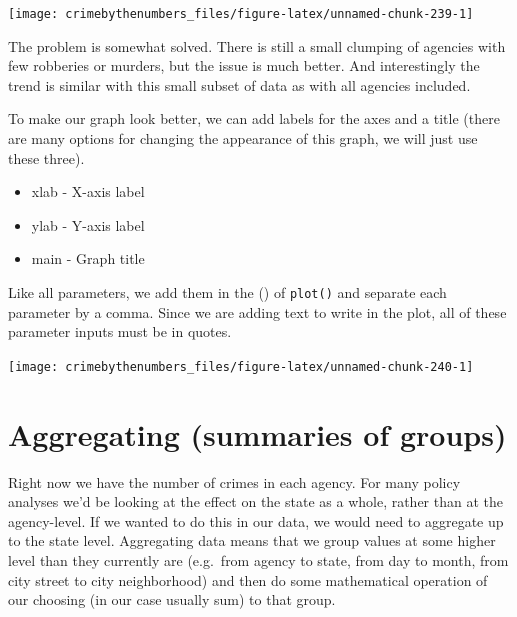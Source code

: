 \documentclass[
  a4paper,
]{krantz}
\makeatletter
\newenvironment{Shaded}{\begin{snugshade}}{\end{snugshade}}
\newcommand{\AttributeTok}[1]{\textcolor[rgb]{0.61,0.61,0.61}{#1}}
\newcommand{\FunctionTok}[1]{\textcolor[rgb]{0,0,0}{#1}}
\newcommand{\NormalTok}[1]{#1}
\newcommand{\SpecialCharTok}[1]{\textcolor[rgb]{0,0,0}{#1}}
\newcommand{\StringTok}[1]{\textcolor[rgb]{0.5,0.5,0.5}{#1}}
\providecommand{\tightlist}{%
  \setlength{\itemsep}{0pt}\setlength{\parskip}{0pt}}
\newenvironment{kframe}{%
\medskip{}
\setlength{\fboxsep}{.8em}
 \def\at@end@of@kframe{}%
 \ifinner\ifhmode%
  \def\at@end@of@kframe{\end{minipage}}%
  \begin{minipage}{\columnwidth}%
 \fi\fi%
 \def\FrameCommand##1{\hskip\@totalleftmargin \hskip-\fboxsep
 \colorbox{shadecolor}{##1}\hskip-\fboxsep
     \hskip-\linewidth \hskip-\@totalleftmargin \hskip\columnwidth}%
 \MakeFramed {\advance\hsize-\width
   \@totalleftmargin\z@ \linewidth\hsize
   \@setminipage}}%
 {\par\unskip\endMakeFramed%
 \at@end@of@kframe}
\renewenvironment{Shaded}{\begin{kframe}}{\end{kframe}}
\makeatother
\begin{document}
\begin{center}\texttt{[image: crimebythenumbers\_files/figure-latex/unnamed-chunk-239-1]} \end{center}

The problem is somewhat solved. There is still a small
clumping of agencies with few robberies or murders, but the
issue is much better. And interestingly the trend is similar
with this small subset of data as with all agencies
included.

To make our graph look better, we can add labels for the
axes and a title (there are many options for changing the
appearance of this graph, we will just use these three).

\begin{itemize}
\tightlist
\item
  xlab - X-axis label
\item
  ylab - Y-axis label
\item
  main - Graph title
\end{itemize}

Like all parameters, we add them in the () of
\texttt{plot()} and separate each parameter by a comma.
Since we are adding text to write in the plot, all of these
parameter inputs must be in quotes.

\begin{Shaded}
\end{Shaded}

\begin{center}\texttt{[image: crimebythenumbers\_files/figure-latex/unnamed-chunk-240-1]} \end{center}

\hypertarget{aggregate}{%
\section{Aggregating (summaries of
groups)}\label{aggregate}}

Right now we have the number of crimes in each agency. For
many policy analyses we'd be looking at the effect on the
state as a whole, rather than at the agency-level. If we
wanted to do this in our data, we would need to aggregate up
to the state level. Aggregating data means that we group
values at some higher level than they currently are
(e.g.~from agency to state, from day to month, from city
street to city neighborhood) and then do some mathematical
operation of our choosing (in our case usually sum) to that
group.
\end{document}
